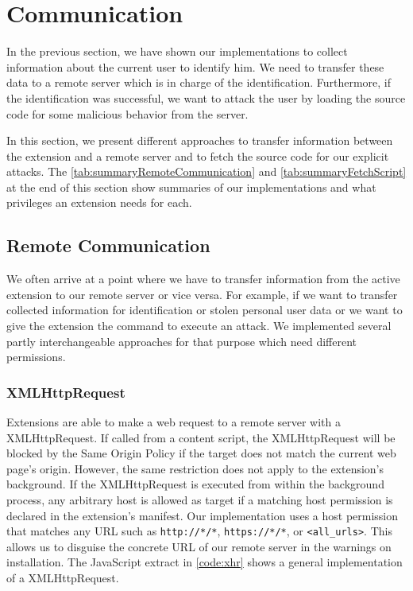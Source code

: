 	
	
	
	
\clearpage
\section{Communication}
\label{sec:communication}

	In the previous section, we have shown our implementations to collect information about the current user to identify him. We need to transfer these data to a remote server which is in charge of the identification. Furthermore, if the identification was successful, we want to attack the user by loading the source code for some malicious behavior from the server.
	
	In this section, we present different approaches to transfer information between the extension and a remote server and to fetch the source code for our explicit attacks. The \autoref{tab:summaryRemoteCommunication} and \autoref{tab:summaryFetchScript} at the end of this section show summaries of our implementations and what privileges an extension needs for each.
	
\subsection{Remote Communication}

	We often arrive at a point where we have to transfer information from the active extension to our remote server or vice versa. For example, if we want to transfer collected information for identification or stolen personal user data or we want to give the extension the command to execute an attack. We implemented several partly interchangeable approaches for that purpose which need different permissions. 

\subsubsection{XMLHttpRequest}
\label{sec:xhrCommunication}

	Extensions are able to make a web request to a remote server with a XMLHttpRequest. If called from a content script, the XMLHttpRequest will be blocked by the Same Origin Policy if the target does not match the current web page's origin. However, the same restriction does not apply to the extension's background. If the XMLHttpRequest is executed from within the background process, any arbitrary host is allowed as target if a matching host permission is declared in the extension's manifest. Our implementation uses a host permission that matches any URL such as \texttt{http://*/*}, \texttt{https://*/*}, or \texttt{<all\_urls>}. This allows us to disguise the concrete URL of our remote server in the warnings on installation. The JavaScript extract in \autoref{code:xhr} shows a general implementation of a XMLHttpRequest. 
	
